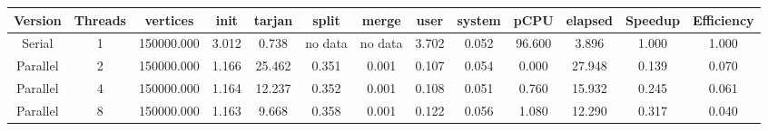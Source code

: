 \begin{tabular}{|c|c|c|c|c|c|c|c|c|c|c|c|c|}
\toprule
 Version &  Threads &   vertices &  init &  tarjan &   split &   merge &  user &  system &   pCPU &  elapsed &  Speedup &  Efficiency \\
\midrule
  Serial &        1 & 150000.000 & 3.012 &   0.738 & no data & no data & 3.702 &   0.052 & 96.600 &    3.896 &    1.000 &       1.000 \\
Parallel &        2 & 150000.000 & 1.166 &  25.462 &   0.351 &   0.001 & 0.107 &   0.054 &  0.000 &   27.948 &    0.139 &       0.070 \\
Parallel &        4 & 150000.000 & 1.164 &  12.237 &   0.352 &   0.001 & 0.108 &   0.051 &  0.760 &   15.932 &    0.245 &       0.061 \\
Parallel &        8 & 150000.000 & 1.163 &   9.668 &   0.358 &   0.001 & 0.122 &   0.056 &  1.080 &   12.290 &    0.317 &       0.040 \\
\bottomrule
\end{tabular}
